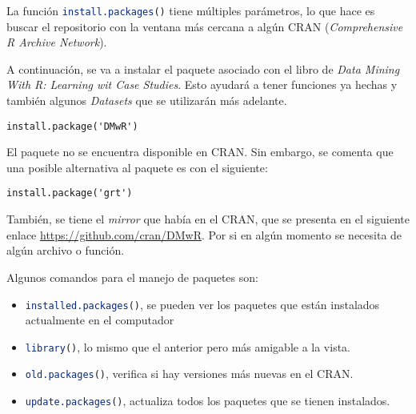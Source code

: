 \documentclass{article}
\begin{document}
La función \lstinline[language=R]{install.packages()} tiene múltiples parámetros, lo que hace es buscar el repositorio con la
ventana más cercana a algún CRAN (\textit{Comprehensive R Archive Network}).

A continuación, se va a instalar el paquete asociado con el libro de \textit{Data Mining With R: Learning wit Case Studies}. Esto ayudará a tener funciones ya hechas y también algunos \textit{Datasets} que se utilizarán más adelante.
\begin{lstlisting}
install.package('DMwR')
\end{lstlisting}

El paquete no se encuentra disponible en CRAN. Sin embargo, se comenta que una posible alternativa al paquete es con el siguiente:
\begin{lstlisting}
install.package('grt')
\end{lstlisting}

También, se tiene el \textit{mirror} que había en el CRAN, que se presenta en el siguiente enlace
\url{https://github.com/cran/DMwR}. Por si en algún momento se necesita de algún archivo o función.

Algunos comandos para el manejo de paquetes son:
\begin{itemize}
  \item \lstinline[language=R]{installed.packages()}, se pueden ver los paquetes que están instalados actualmente en el computador
  \item \lstinline[language=R]{library()}, lo mismo que el anterior pero más amigable a la vista.
  \item \lstinline[language=R]{old.packages()}, verifica si hay versiones más nuevas en el CRAN.
  \item \lstinline[language=R]{update.packages()}, actualiza todos los paquetes que se tienen instalados.
\end{itemize}
\end{document}
